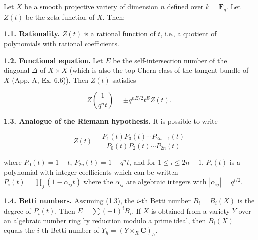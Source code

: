 Let $X$ be a smooth projective variety of dimension $n$ defined over $k = \mathbf{F}_q$. Let $Z(t)$ be the zeta function of $X$. Then:

\textbf{1.1. Rationality.} $Z(t)$ is a rational function of $t$, i.e., a quotient of polynomials with rational coefficients.

\textbf{1.2. Functional equation.} Let $E$ be the self-intersection number of the diagonal $\Delta$ of $X \times X$ (which is also the top Chern class of the tangent bundle of $X$ (App. A, Ex. 6.6)). Then $Z(t)$ satisfies

$$Z\left(\frac{1}{q^n t}\right) = \pm q^{nE/2} t^E Z(t).$$

\textbf{1.3. Analogue of the Riemann hypothesis.} It is possible to write

$$Z(t) = \frac{P_1(t) P_3(t) \cdots P_{2n-1}(t)}{P_0(t) P_2(t) \cdots P_{2n}(t)}$$

where $P_0(t) = 1-t$, $P_{2n}(t) = 1-q^n t$, and for $1 \leqslant i \leqslant 2n-1$, $P_i(t)$ is a polynomial with integer coefficients which can be written $P_i(t) = \prod_j (1 - \alpha_{ij} t)$ where the $\alpha_{ij}$ are algebraic integers with $|\alpha_{ij}| = q^{i/2}$.

\textbf{1.4. Betti numbers.} Assuming (1.3), the $i$-th Betti number $B_i = B_i(X)$ is the degree of $P_i(t)$. Then $E = \sum (-1)^i B_i$. If $X$ is obtained from a variety $Y$ over an algebraic number ring by reduction modulo a prime ideal, then $B_i(X)$ equals the $i$-th Betti number of $Y_h = (Y \times_R \mathbf{C})_h$.
